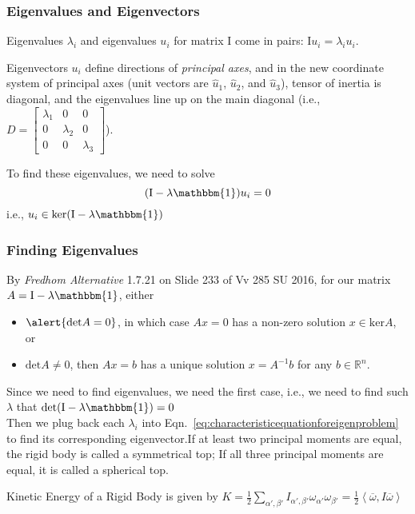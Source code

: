 \begin{frame}
\frametitle{Eigenvalues and Eigenvectors}
Eigenvalues $\lambda_i$ and eigenvalues $u_i$ for matrix $\mathrm{I}$ come in pairs: $\mathrm{I} u_i=\lambda_i u_i$.
\begin{theorem}
Eigenvectors $u_i$ define \alert{directions} of \emph{principal axes}, and in the new \alert{coordinate system of principal axes} (unit vectors are $\hat{u}_1$, $\hat{u}_2$, and $\hat{u}_3$), tensor of inertia is diagonal, and the \alert{eigenvalues line up on the main diagonal} (i.e., $D=\left[\begin{matrix}\lambda_1&0&0\\0&\lambda_2&0\\0&0&\lambda_3\end{matrix}\right]$).
\end{theorem}
To find these eigenvalues, we need to solve 
\begin{equation}\label{eq:characteristicequationforeigenproblem}
(\mathrm{I}-\lambda\mathbbm{1})u_i=0
\end{equation}
i.e., $u_i\in\mathrm{ker (I-\lambda\mathbbm{1})}$
\end{frame}
\begin{frame}
\frametitle{Finding Eigenvalues}
By \emph{Fredhom Alternative} 1.7.21 on Slide 233 of Vv 285 SU 2016, for our matrix $A=\mathrm{I}-\lambda\mathbbm{1}$, either 
\begin{itemize}
\item$\alert{\mathrm{det} A=0}$, in which case $Ax=0$ has a non-zero solution \alert{$x\in\mathrm{ker}A$}, or
\item $\mathrm{det}A\neq 0$, then $Ax=b$ has a unique solution $x=A^{-1}b$ for any $b\in\mathbb{R}^n$.
\end{itemize}
Since we need to find eigenvalues, we need the first case, i.e., we need to find such $\lambda$ that \alert{$\mathrm{det}(\mathrm{I}-\lambda\mathbbm{1})=0$}\\
Then we plug back each $\lambda_i$ into Eqn.~\ref{eq:characteristicequationforeigenproblem} to find its corresponding eigenvector.\pause If at least two principal moments are equal, the rigid body is called a symmetrical top; If all three principal moments are equal, it is called a spherical top.
\begin{theorem}
\alert{Kinetic Energy of a Rigid Body} is given by $K=\frac{1}{2}\sum_{\alpha',\beta'}I_{\alpha',\beta'}\omega_{\alpha'}\omega_{\beta'}=\frac{1}{2}\left<\overline\omega,I\overline{\omega}\right>$
\end{theorem}
\end{frame}
